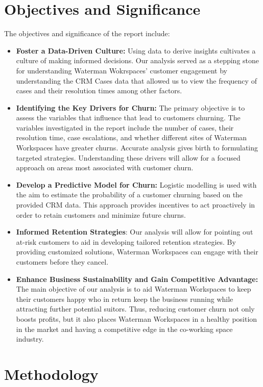 \documentclass[
]{article}
\begin{document}
\section{Objectives and Significance}\label{objectives-and-significance}

The objectives and significance of the report include:

\begin{itemize}
\item
  \textbf{Foster a Data-Driven Culture:} Using data to derive insights cultivates a culture of making informed decisions. Our analysis served as a stepping stone for understanding Waterman Wokrspaces' customer engagement by understanding the CRM Cases data that allowed us to view the frequency of cases and their resolution times among other factors.
\item
  \textbf{Identifying the Key Drivers for Churn:} The primary objective is to assess the variables that influence that lead to customers churning. The variables investigated in the report include the number of cases, their resolution time, case escalations, and whether different sites of Waterman Workspaces have greater churns. Accurate analysis gives birth to formulating targeted strategies. Understanding these drivers will allow for a focused approach on areas most associated with customer churn.
\item
  \textbf{Develop a Predictive Model for Churn:} Logistic modelling is used with the aim to estimate the probability of a customer churning based on the provided CRM data. This approach provides incentives to act proactively in order to retain customers and minimize future churns.
\item
  \textbf{Informed Retention Strategies}: Our analysis will allow for pointing out at-risk customers to aid in developing tailored retention strategies. By providing customized solutions, Waterman Workspaces can engage with their customers before they cancel.
\item
  \textbf{Enhance Business Sustainability and Gain Competitive Advantage:} The main objective of our analysis is to aid Waterman Workspaces to keep their customers happy who in return keep the business running while attracting further potential suitors. Thus, reducing customer churn not only boosts profits, but it also places Waterman Workspaces in a healthy position in the market and having a competitive edge in the co-working space industry.
\end{itemize}

\section{Methodology}\label{methodology}
\end{document}
